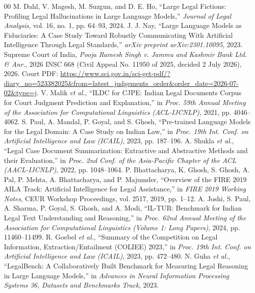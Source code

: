 \documentclass[conference]{IEEEtran}
\begin{document}
\begin{thebibliography}{00}
 M. Dahl, V. Magesh, M. Suzgun, and D. E. Ho, ``Large Legal Fictions: Profiling Legal Hallucinations in Large Language Models,'' \textit{Journal of Legal Analysis}, vol. 16, no. 1, pp. 64--93, 2024.
 J. J. Nay, ``Large Language Models as Fiduciaries: A Case Study Toward Robustly Communicating With Artificial Intelligence Through Legal Standards,'' \textit{arXiv preprint arXiv:2301.10095}, 2023.
 Supreme Court of India, \textit{Pooja Ramesh Singh v. Jammu and Kashmir Bank Ltd. \& Anr.}, 2026 INSC 668 (Civil Appeal No. 11950 of 2025, decided 2 July 2026), 2026. Court PDF: \url{https://www.sci.gov.in/sci-get-pdf/?diary_no=523382025&from=latest_judgements_order&order_date=2026-07-02&type=j}.
 V. Malik \textit{et al.}, ``ILDC for CJPE: Indian Legal Documents Corpus for Court Judgment Prediction and Explanation,'' in \textit{Proc. 59th Annual Meeting of the Association for Computational Linguistics (ACL-IJCNLP)}, 2021, pp. 4046--4062.
 S. Paul, A. Mandal, P. Goyal, and S. Ghosh, ``Pre-trained Language Models for the Legal Domain: A Case Study on Indian Law,'' in \textit{Proc. 19th Int. Conf. on Artificial Intelligence and Law (ICAIL)}, 2023, pp. 187--196.
 A. Shukla \textit{et al.}, ``Legal Case Document Summarization: Extractive and Abstractive Methods and their Evaluation,'' in \textit{Proc. 2nd Conf. of the Asia-Pacific Chapter of the ACL (AACL-IJCNLP)}, 2022, pp. 1048--1064.
 P. Bhattacharya, K. Ghosh, S. Ghosh, A. Pal, P. Mehta, A. Bhattacharya, and P. Majumder, ``Overview of the FIRE 2019 AILA Track: Artificial Intelligence for Legal Assistance,'' in \textit{FIRE 2019 Working Notes}, CEUR Workshop Proceedings, vol. 2517, 2019, pp. 1--12.
 A. Joshi, S. Paul, A. Sharma, P. Goyal, S. Ghosh, and A. Modi, ``IL-TUR: Benchmark for Indian Legal Text Understanding and Reasoning,'' in \textit{Proc. 62nd Annual Meeting of the Association for Computational Linguistics (Volume 1: Long Papers)}, 2024, pp. 11460--11499.
 R. Goebel \textit{et al.}, ``Summary of the Competition on Legal Information, Extraction/Entailment (COLIEE) 2023,'' in \textit{Proc. 19th Int. Conf. on Artificial Intelligence and Law (ICAIL)}, 2023, pp. 472--480.
 N. Guha \textit{et al.}, ``LegalBench: A Collaboratively Built Benchmark for Measuring Legal Reasoning in Large Language Models,'' in \textit{Advances in Neural Information Processing Systems 36, Datasets and Benchmarks Track}, 2023.

\end{thebibliography}
\end{document}
